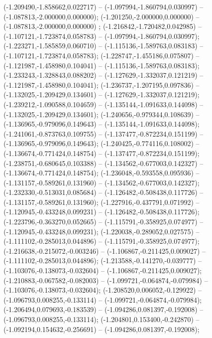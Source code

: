  (-1.209490,-1.858662,0.022717) -- (-1.097994,-1.860794,0.030997) -- (-1.087813,-2.000000,0.000000);
 (-1.201250,-2.000000,0.000000) -- (-1.087813,-2.000000,0.000000) ;
 (-1.216842,-1.720482,0.042985) -- (-1.107121,-1.723874,0.058783) -- (-1.097994,-1.860794,0.030997);
 (-1.223271,-1.585859,0.060710) -- (-1.115136,-1.589763,0.083183) -- (-1.107121,-1.723874,0.058783);
 (-1.228747,-1.455186,0.075807) -- (-1.121987,-1.458980,0.104041) -- (-1.115136,-1.589763,0.083183);
 (-1.233243,-1.328843,0.088202) -- (-1.127629,-1.332037,0.121219) -- (-1.121987,-1.458980,0.104041);
 (-1.236737,-1.207195,0.097836) -- (-1.132025,-1.209429,0.134601) -- (-1.127629,-1.332037,0.121219);
 (-1.239212,-1.090588,0.104659) -- (-1.135144,-1.091633,0.144098) -- (-1.132025,-1.209429,0.134601);
 (-1.240656,-0.979344,0.108639) -- (-1.136965,-0.979096,0.149643) -- (-1.135144,-1.091633,0.144098);
 (-1.241061,-0.873763,0.109755) -- (-1.137477,-0.872234,0.151199) -- (-1.136965,-0.979096,0.149643);
 (-1.240425,-0.774116,0.108002) -- (-1.136674,-0.771424,0.148754) -- (-1.137477,-0.872234,0.151199);
 (-1.238751,-0.680645,0.103388) -- (-1.134562,-0.677003,0.142327) -- (-1.136674,-0.771424,0.148754);
 (-1.236048,-0.593558,0.095936) -- (-1.131157,-0.589261,0.131960) -- (-1.134562,-0.677003,0.142327);
 (-1.232330,-0.513031,0.085684) -- (-1.126482,-0.508438,0.117726) -- (-1.131157,-0.589261,0.131960);
 (-1.227916,-0.437791,0.071992) -- (-1.120945,-0.433248,0.099231) -- (-1.126482,-0.508438,0.117726);
 (-1.223796,-0.363270,0.052665) -- (-1.115791,-0.358925,0.074977) -- (-1.120945,-0.433248,0.099231);
 (-1.220038,-0.289052,0.027575) -- (-1.111102,-0.285013,0.044896) -- (-1.115791,-0.358925,0.074977);
 (-1.216638,-0.215072,-0.003246) -- (-1.106867,-0.211425,0.009027) -- (-1.111102,-0.285013,0.044896);
 (-1.213588,-0.141270,-0.039777) -- (-1.103076,-0.138073,-0.032604) -- (-1.106867,-0.211425,0.009027);
 (-1.210883,-0.067582,-0.082003) -- (-1.099721,-0.064874,-0.079984) -- (-1.103076,-0.138073,-0.032604);
 (-1.208520,0.006052,-0.129922) -- (-1.096793,0.008255,-0.133114) -- (-1.099721,-0.064874,-0.079984);
 (-1.206494,0.079693,-0.183539) -- (-1.094286,0.081397,-0.192008) -- (-1.096793,0.008255,-0.133114);
 (-1.204801,0.153400,-0.242870) -- (-1.092194,0.154632,-0.256691) -- (-1.094286,0.081397,-0.192008);
